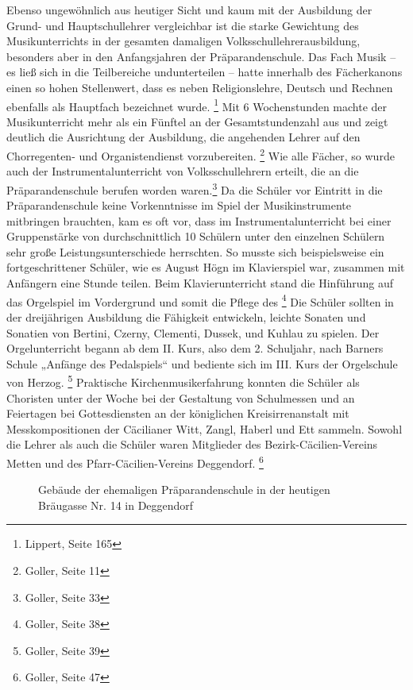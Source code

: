 Ebenso ungewöhnlich aus heutiger Sicht und kaum mit der Ausbildung der
Grund- und Hauptschullehrer vergleichbar ist die starke Gewichtung des
Musikunterrichts in der gesamten damaligen Volksschullehrerausbildung,
besonders aber in den Anfangsjahren der Präparandenschule. Das Fach
Musik – es ließ sich in die Teilbereiche undunterteilen – hatte innerhalb des Fächerkanons einen so hohen
Stellenwert, dass es neben Religionslehre, Deutsch und Rechnen
ebenfalls als Hauptfach bezeichnet wurde. \footnote{Lippert, Seite 165}
Mit 6 Wochenstunden machte der Musikunterricht mehr als ein Fünftel an
der Gesamtstundenzahl aus und zeigt deutlich die Ausrichtung der
Ausbildung, die angehenden Lehrer auf den Chorregenten- und
Organistendienst vorzubereiten. \footnote{Goller, Seite 11} Wie alle
Fächer, so wurde auch der Instrumentalunterricht von Volksschullehrern
erteilt, die an die Präparandenschule berufen worden waren.\footnote{
Goller, Seite 33} Da die Schüler vor Eintritt in die Präparandenschule
keine Vorkenntnisse im Spiel der Musikinstrumente mitbringen brauchten,
kam es oft vor, dass im Instrumentalunterricht bei einer Gruppenstärke
von durchschnittlich 10 Schülern unter den einzelnen Schülern sehr
große Leistungsunterschiede herrschten. So musste sich beispielsweise
ein fortgeschrittener Schüler, wie es August Högn im Klavierspiel war,
zusammen mit Anfängern eine Stunde teilen. Beim Klavierunterricht stand
die Hinführung auf das Orgelspiel im Vordergrund und somit die Pflege
des   \footnote{Goller, Seite 38}
Die Schüler sollten in der dreijährigen Ausbildung die Fähigkeit
entwickeln, leichte Sonaten und Sonatien von Bertini, Czerny, Clementi,
Dussek, und Kuhlau zu spielen. Der Orgelunterricht begann ab dem II.
Kurs, also dem 2. Schuljahr, nach Barners Schule „Anfänge des
Pedalspiels“ und bediente sich im III. Kurs der Orgelschule von
Herzog. \footnote{Goller, Seite 39} Praktische Kirchenmusikerfahrung
konnten die Schüler als Choristen unter der Woche bei der Gestaltung
von Schulmessen und an Feiertagen bei Gottesdiensten an der königlichen
Kreisirrenanstalt mit Messkompositionen der Cäcilianer Witt, Zangl,
Haberl und Ett sammeln. Sowohl die Lehrer als auch die Schüler waren
Mitglieder des Bezirk-Cäcilien-Vereins Metten und des
Pfarr-Cäcilien-Vereins Deggendorf. \footnote{Goller, Seite 47}

\begin{figure}
\centering
{}
\caption{Gebäude der ehemaligen Präparandenschule in der heutigen
Bräugasse Nr. 14 in Deggendorf}
\end{figure}

